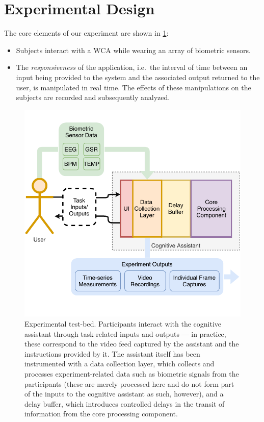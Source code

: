 \documentclass[10pt,letterpaper]{article}
\begin{document}
\section{Experimental Design}\label{sec:experimentaldesign}

The core elements of our experiment are shown in \cref{fig:experimentaltestbed}:
\begin{itemize}
    \item Subjects interact with a WCA while wearing an array of biometric sensors.
    \item The \emph{responsiveness} of the application, i.e.\ the interval of time between an input being provided to the system and the associated output returned to the user, is manipulated in real time. 
    The effects of these manipulations on the subjects are recorded and subsequently analyzed.    
\end{itemize}

\begin{figure}[h]
  \centering
  \includegraphics[width=.8\textwidth]{images/experiment_arch.pdf}
  \caption{Experimental test-bed.
  Participants interact with the cognitive assistant through task-related inputs and outputs --- in practice, these correspond to the video feed captured by the assistant and the instructions provided by it.
  The assistant itself has been instrumented with a data collection layer, which collects and processes experiment-related data such as biometric signals from the participants (these are merely processed here and do not form part of the inputs to the cognitive assistant as such, however), and a delay buffer, which introduces controlled delays in the transit of information from the core processing component.}%
  \label{fig:experimentaltestbed}
\end{figure}
\end{document}
